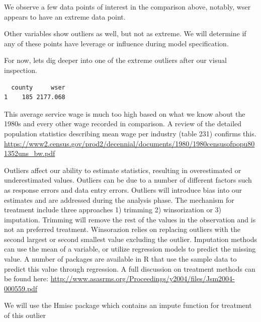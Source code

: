 \documentclass[]{article}
\newenvironment{Shaded}{}{}
\newcommand{\DecValTok}[1]{#1}
\newcommand{\KeywordTok}[1]{\textcolor[rgb]{0.00,0.00,1.00}{#1}}
\newcommand{\NormalTok}[1]{#1}
\newcommand{\OperatorTok}[1]{#1}
\newcommand{\StringTok}[1]{\textcolor[rgb]{0.00,0.50,0.50}{#1}}
\begin{document}
We observe a few data points of interest in the comparison above,
notably, wser appears to have an extreme data point.

Other variables show outliers as well, but not as extreme. We will
determine if any of these points have leverage or influence during model
specification.

For now, lets dig deeper into one of the extreme outliers after our
visual inspection.

\begin{Shaded}
\end{Shaded}

\begin{verbatim}
  county     wser
1    185 2177.068
\end{verbatim}

This average service wage is much too high based on what we know about
the 1980s and every other wage recorded in comparison. A review of the
detailed population statistics describing mean wage per industry (table
231) confirms this.
\url{https://www2.census.gov/prod2/decennial/documents/1980/1980censusofpopu801352uns_bw.pdf}

Outliers affect our ability to estimate statistics, resulting in
overestimated or underestimated values. Outliers can be due to a number
of different factors such as response errors and data entry errors.
Outliers will introduce bias into our estimates and are addressed during
the analysis phase. The mechanism for treatment include three approaches
1) trimming 2) winsorization or 3) imputation. Trimming will remove the
rest of the values in the observation and is not an preferred treatment.
Winsorazion relies on replacing outliers with the second largest or
second smallest value excluding the outlier. Imputation methods can use
the mean of a variable, or utilize regression models to predict the
missing value. A number of packages are available in R that use the
sample data to predict this value through regression. A full discussion
on treatment methods can be found here:
\url{http://www.asasrms.org/Proceedings/y2004/files/Jsm2004-000559.pdf}

We will use the Hmisc package which contains an impute function for
treatment of this outlier
\end{document}

